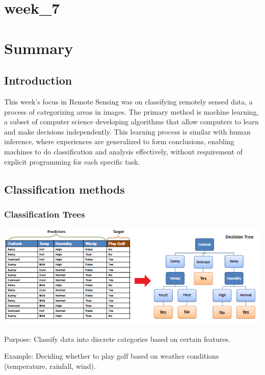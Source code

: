 \documentclass[
  letterpaper,
  DIV=11,
  numbers=noendperiod]{scrreprt}
\begin{document}
\chapter{week\_7}\label{week_7}


\chapter{Summary}\label{summary-1}

\section{Introduction}\label{introduction-2}

This week's focus in Remote Sensing was on classifying remotely sensed
data, a process of categorizing areas in images. The primary method is
machine learning, a subset of computer science developing algorithms
that allow computers to learn and make decisions independently. This
learning process is similar with human inference, where experiences are
generalized to form conclusions, enabling machines to do classification
and analysis effectively, without requirement of explicit programming
for each specific task.

\section{Classification methods}\label{classification-methods}

\subsection{Classification Trees}\label{classification-trees}

\includegraphics{classification tree.png}

Purpose: Classify data into discrete categories based on certain
features.

Example: Deciding whether to play golf based on weather conditions
(temperature, rainfall, wind).
\end{document}
